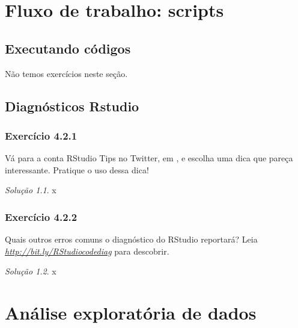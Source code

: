 \documentclass[
]{latex/krantz}
\theoremstyle{definition}
\theoremstyle{definition}
\theoremstyle{definition}
\theoremstyle{definition}
\theoremstyle{remark}
\newtheorem*{solution}{Solução}
\begin{document}
\hypertarget{fluxo-de-trabalho-scripts}{%
\chapter{Fluxo de trabalho: scripts}\label{fluxo-de-trabalho-scripts}}

\hypertarget{executando-cuxf3digos}{%
\section{Executando códigos}\label{executando-cuxf3digos}}

Não temos exercícios neste seção.

\hypertarget{diagnuxf3sticos-rstudio}{%
\section{Diagnósticos Rstudio}\label{diagnuxf3sticos-rstudio}}

\hypertarget{exr4-2-1}{%
\subsection*{Exercício 4.2.1}\label{exr4-2-1}}

Vá para a conta RStudio Tips no Twitter, em \emph{\citet{rstudiotips}}, e escolha uma dica que pareça interessante. Pratique o uso dessa dica!

\begin{solution}
x
\end{solution}

\hypertarget{exr4-2-2}{%
\subsection*{Exercício 4.2.2}\label{exr4-2-2}}

Quais outros erros comuns o diagnóstico do RStudio reportará? Leia \emph{\url{http://bit.ly/RStudiocodediag}} para descobrir.

\begin{solution}
x
\end{solution}

\hypertarget{anuxe1lise-exploratuxf3ria-de-dados}{%
\chapter{Análise exploratória de dados}\label{anuxe1lise-exploratuxf3ria-de-dados}}
\end{document}
